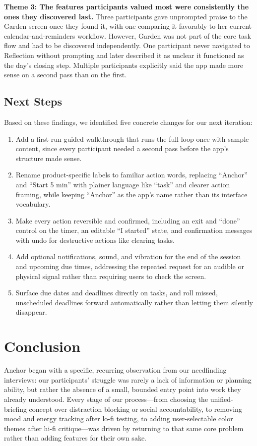 \documentclass[sigplan,screen]{acmart}
\begin{document}
\textbf{Theme 3: The features participants valued most were consistently the ones they discovered last.} Three participants gave unprompted praise to the Garden screen once they found it, with one comparing it favorably to her current calendar-and-reminders workflow. However, Garden was not part of the core task flow and had to be discovered independently. One participant never navigated to Reflection without prompting and later described it as unclear it functioned as the day’s closing step. Multiple participants explicitly said the app made more sense on a second pass than on the first.

\subsection{Next Steps}
Based on these findings, we identified five concrete changes for our next iteration:
\begin{enumerate}
  \item Add a first-run guided walkthrough that runs the full loop once with sample content, since every participant needed a second pass before the app's structure made sense.
  \item Rename product-specific labels to familiar action words, replacing ``Anchor'' and ``Start 5 min'' with plainer language like ``task'' and clearer action framing, while keeping ``Anchor'' as the app's name rather than its interface vocabulary.
  \item Make every action reversible and confirmed, including an exit and ``done'' control on the timer, an editable ``I started'' state, and confirmation messages with undo for destructive actions like clearing tasks.
  \item Add optional notifications, sound, and vibration for the end of the session and upcoming due times, addressing the repeated request for an audible or physical signal rather than requiring users to check the screen.
  \item Surface due dates and deadlines directly on tasks, and roll missed, unscheduled deadlines forward automatically rather than letting them silently disappear.
\end{enumerate}

\section{Conclusion}
Anchor began with a specific, recurring observation from our needfinding interviews: our participants’ struggle was rarely a lack of information or planning ability, but rather the absence of a small, bounded entry point into work they already understood. Every stage of our process—from choosing the unified-briefing concept over distraction blocking or social accountability, to removing mood and energy tracking after lo-fi testing, to adding user-selectable color themes after hi-fi critique—was driven by returning to that same core problem rather than adding features for their own sake.
\end{document}
